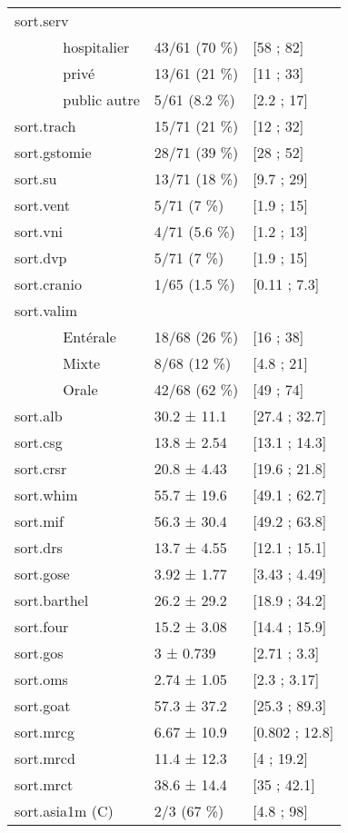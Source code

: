\documentclass[]{article}
\begin{document}
\begin{longtable}{lll}
  sort.serv &   &   \\ 
  ~~~~~~ hospitalier & 43/61 (70 \%) &  [58 ; 82] \\ 
  ~~~~~~ privé & 13/61 (21 \%) &  [11 ; 33] \\ 
  ~~~~~~ public autre & 5/61 (8.2 \%) &  [2.2 ; 17] \\ 
  sort.trach & 15/71 (21 \%) &  [12 ; 32] \\ 
  sort.gstomie & 28/71 (39 \%) &  [28 ; 52] \\ 
  sort.su & 13/71 (18 \%) &  [9.7 ; 29] \\ 
  sort.vent & 5/71 (7 \%) &  [1.9 ; 15] \\ 
  sort.vni & 4/71 (5.6 \%) &  [1.2 ; 13] \\ 
  sort.dvp & 5/71 (7 \%) &  [1.9 ; 15] \\ 
  sort.cranio & 1/65 (1.5 \%) &  [0.11 ; 7.3] \\ 
  sort.valim &   &   \\ 
  ~~~~~~ Entérale & 18/68 (26 \%) &  [16 ; 38] \\ 
  ~~~~~~ Mixte & 8/68 (12 \%) &  [4.8 ; 21] \\ 
  ~~~~~~ Orale & 42/68 (62 \%) &  [49 ; 74] \\ 
  sort.alb & 30.2 ± 11.1 & [27.4 ; 32.7] \\ 
  sort.csg & 13.8 ± 2.54 & [13.1 ; 14.3] \\ 
  sort.crsr & 20.8 ± 4.43 & [19.6 ; 21.8] \\ 
  sort.whim & 55.7 ± 19.6 & [49.1 ; 62.7] \\ 
  sort.mif & 56.3 ± 30.4 & [49.2 ; 63.8] \\ 
  sort.drs & 13.7 ± 4.55 & [12.1 ; 15.1] \\ 
  sort.gose & 3.92 ± 1.77 & [3.43 ; 4.49] \\ 
  sort.barthel & 26.2 ± 29.2 & [18.9 ; 34.2] \\ 
  sort.four & 15.2 ± 3.08 & [14.4 ; 15.9] \\ 
  sort.gos & 3 ± 0.739 & [2.71 ; 3.3] \\ 
  sort.oms & 2.74 ± 1.05 & [2.3 ; 3.17] \\ 
  sort.goat & 57.3 ± 37.2 & [25.3 ; 89.3] \\ 
  sort.mrcg & 6.67 ± 10.9 & [0.802 ; 12.8] \\ 
  sort.mrcd & 11.4 ± 12.3 & [4 ; 19.2] \\ 
  sort.mrct & 38.6 ± 14.4 & [35 ; 42.1] \\ 
  sort.asia1m (C) & 2/3 (67 \%) &  [4.8 ; 98] \\ 

\end{longtable}
\end{document}
